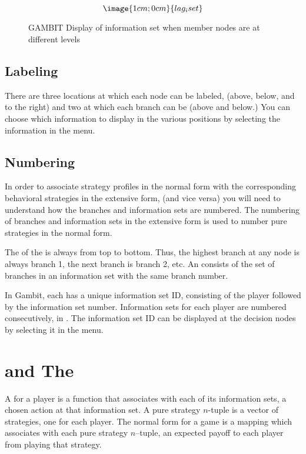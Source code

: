 \begin{figure}\label{fig_lag_iset}
$$\image{1cm;0cm}{lag_iset}$$
\caption{GAMBIT Display of information set when member nodes are at different levels}\label{fig_lag_iset}
\end{figure}

\subsection{Labeling}
There are three locations at which each node can be labeled, (above,
below, and to the right) and two at which each branch can be
 (above and below.) You can choose which
information to display in the various positions by selecting the
information in the  menu.

\subsection{Numbering}\label{infosetnumbering}
In order  to associate strategy profiles in the 
normal form with the corresponding behavioral strategies in the extensive 
form, (and vice versa) you will need to understand how the branches and 
information sets are numbered.  The numbering of branches and information 
sets in the extensive form  is used to number pure strategies in the normal form.  

The  of the  is always
from top to bottom.  Thus, the highest branch at any node is always branch
1, the next branch is branch 2, etc. An  consists of 
the set of branches in an information set with the same branch number.  

In Gambit, each  has a unique 
information set ID, consisting of the player followed by the information 
set number.  Information sets for each player are numbered consecutively, 
in .  
The information set ID can be displayed at the decision nodes by selecting 
it in the  menu.  

\section{ and The }

A  for a player is a function that 
associates with each of 
its information sets, a chosen action at that information set.  A pure 
strategy $n$-tuple is a vector of strategies, one for each player.  
The normal form for a game is a mapping which associates with each pure 
strategy $n$--tuple, an expected payoff to each player from 
playing that strategy. 

